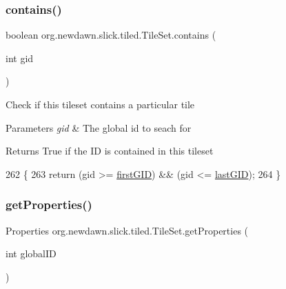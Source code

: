 \subsubsection{\texorpdfstring{contains()}{contains()}}
{\footnotesize\ttfamily boolean org.\+newdawn.\+slick.\+tiled.\+Tile\+Set.\+contains (\begin{DoxyParamCaption}\item[{int}]{gid }\end{DoxyParamCaption})\hspace{0.3cm}{\ttfamily [inline]}}

Check if this tileset contains a particular tile


\begin{DoxyParams}{Parameters}
{\em gid} & The global id to seach for \\
\hline
\end{DoxyParams}
\begin{DoxyReturn}{Returns}
True if the ID is contained in this tileset 
\end{DoxyReturn}

\begin{DoxyCode}
262                                      \{
263         \textcolor{keywordflow}{return} (gid >= \mbox{\hyperlink{classorg_1_1newdawn_1_1slick_1_1tiled_1_1_tile_set_a7c27767efccd6a3a68dfa519251fbec1}{firstGID}}) && (gid <= \mbox{\hyperlink{classorg_1_1newdawn_1_1slick_1_1tiled_1_1_tile_set_a828b4b9fe91730b4e4e24b6f3f443b1b}{lastGID}});
264     \}
\end{DoxyCode}
\mbox{\label{classorg_1_1newdawn_1_1slick_1_1tiled_1_1_tile_set_a133a935b972264395d06603a8c874be1}} 
\subsubsection{\texorpdfstring{get\+Properties()}{getProperties()}}
{\footnotesize\ttfamily Properties org.\+newdawn.\+slick.\+tiled.\+Tile\+Set.\+get\+Properties (\begin{DoxyParamCaption}\item[{int}]{global\+ID }\end{DoxyParamCaption})\hspace{0.3cm}{\ttfamily [inline]}}

